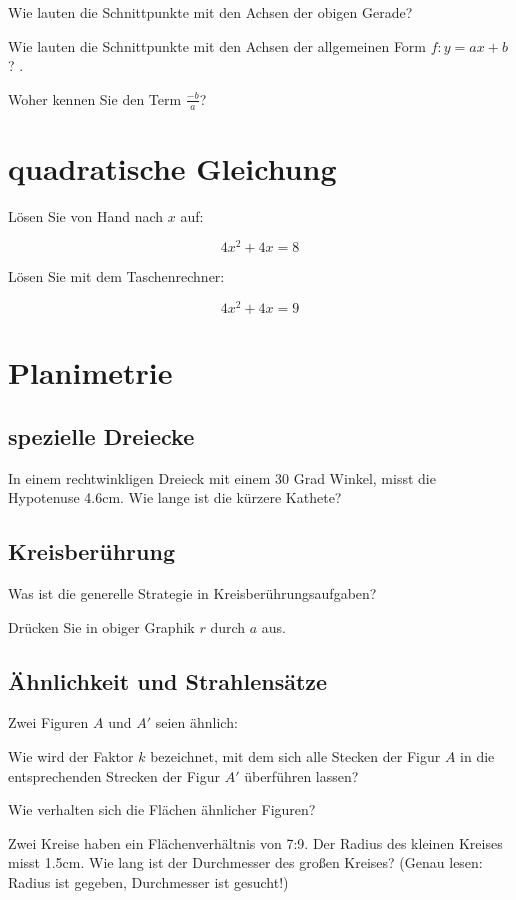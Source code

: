 Wie lauten die Schnittpunkte mit den Achsen der obigen Gerade?

Wie lauten die Schnittpunkte mit den Achsen der allgemeinen Form $f: y=ax+b$? .

Woher kennen Sie den Term $\frac{-b}{a}$?

\section{quadratische Gleichung}
Lösen Sie von Hand nach $x$ auf:

$$4x^2 +4x = 8$$

Lösen Sie mit dem Taschenrechner:

$$4x^2 + 4x = 9$$


\section{Planimetrie}
\subsection{spezielle Dreiecke}
In einem rechtwinkligen Dreieck mit einem 30 Grad Winkel, misst die Hypotenuse 4.6cm. Wie lange ist die kürzere Kathete? 

\subsection{Kreisberührung}
Was ist die generelle Strategie in Kreisberührungsaufgaben?

Drücken Sie in obiger Graphik $r$ durch $a$ aus.
\subsection{Ähnlichkeit und Strahlensätze}
Zwei Figuren $A$ und $A'$ seien ähnlich:

Wie wird der Faktor $k$ bezeichnet, mit dem sich alle Stecken der Figur $A$ in die entsprechenden Strecken der Figur $A'$ überführen lassen?

Wie verhalten sich die Flächen ähnlicher Figuren?

Zwei Kreise haben ein Flächenverhältnis von 7:9. Der Radius des
kleinen Kreises misst 1.5cm. Wie lang ist der Durchmesser des großen
Kreises? (Genau lesen: Radius ist gegeben, Durchmesser ist gesucht!)



